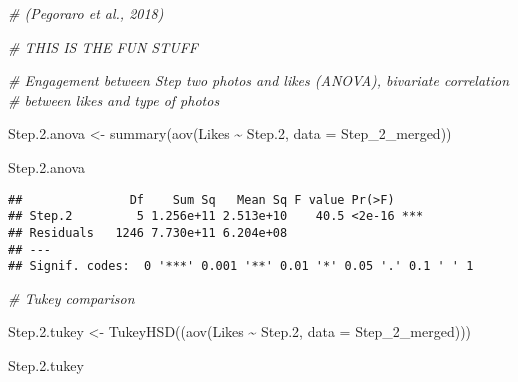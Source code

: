 \documentclass[
]{article}
\newenvironment{Shaded}{\begin{snugshade}}{\end{snugshade}}
\newcommand{\AttributeTok}[1]{\textcolor[rgb]{0.77,0.63,0.00}{#1}}
\newcommand{\CommentTok}[1]{\textcolor[rgb]{0.56,0.35,0.01}{\textit{#1}}}
\newcommand{\FloatTok}[1]{\textcolor[rgb]{0.00,0.00,0.81}{#1}}
\newcommand{\FunctionTok}[1]{\textcolor[rgb]{0.00,0.00,0.00}{#1}}
\newcommand{\NormalTok}[1]{#1}
\newcommand{\OtherTok}[1]{\textcolor[rgb]{0.56,0.35,0.01}{#1}}
\newcommand{\SpecialCharTok}[1]{\textcolor[rgb]{0.00,0.00,0.00}{#1}}
\begin{document}
\begin{Shaded}
\begin{Highlighting}[]
\CommentTok{\# (Pegoraro et al., 2018)}

\CommentTok{\# THIS IS THE FUN STUFF}

\CommentTok{\# Engagement between Step two photos and likes (ANOVA), bivariate correlation}
\CommentTok{\# between likes and type of photos }

\NormalTok{Step.}\FloatTok{2.}\NormalTok{anova }\OtherTok{\textless{}{-}}
  \FunctionTok{summary}\NormalTok{(}\FunctionTok{aov}\NormalTok{(Likes }\SpecialCharTok{\textasciitilde{}}\NormalTok{ Step}\FloatTok{.2}\NormalTok{, }\AttributeTok{data =}\NormalTok{ Step\_2\_merged))}

\NormalTok{Step.}\FloatTok{2.}\NormalTok{anova}
\end{Highlighting}
\end{Shaded}

\begin{verbatim}
##               Df    Sum Sq   Mean Sq F value Pr(>F)    
## Step.2         5 1.256e+11 2.513e+10    40.5 <2e-16 ***
## Residuals   1246 7.730e+11 6.204e+08                   
## ---
## Signif. codes:  0 '***' 0.001 '**' 0.01 '*' 0.05 '.' 0.1 ' ' 1
\end{verbatim}

\begin{Shaded}
\begin{Highlighting}[]
\CommentTok{\# Tukey comparison}

\NormalTok{Step.}\FloatTok{2.}\NormalTok{tukey }\OtherTok{\textless{}{-}} \FunctionTok{TukeyHSD}\NormalTok{((}\FunctionTok{aov}\NormalTok{(Likes }\SpecialCharTok{\textasciitilde{}}\NormalTok{ Step}\FloatTok{.2}\NormalTok{, }\AttributeTok{data =}\NormalTok{ Step\_2\_merged)))}

\NormalTok{Step.}\FloatTok{2.}\NormalTok{tukey}
\end{Highlighting}
\end{Shaded}
\end{document}
